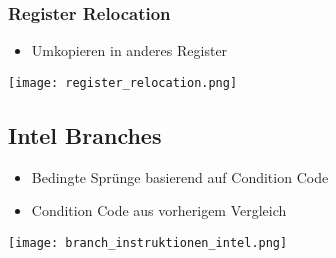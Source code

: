 \subsubsection{Register Relocation}
\begin{itemize}
    \item Umkopieren in anderes Register
\end{itemize}
\texttt{[image: register\_relocation.png]}

\subsection{Intel Branches}
\begin{itemize}
    \item Bedingte Sprünge basierend auf Condition Code
    \item Condition Code aus vorherigem Vergleich
\end{itemize}
\texttt{[image: branch\_instruktionen\_intel.png]}
